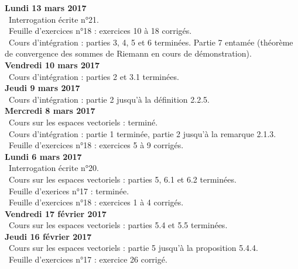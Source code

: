 \documentclass[12pt,a4paper]{article}
\begin{document}
\noindent\textbf{Lundi 13 mars 2017}\\
\bu\ Interrogation écrite n°21.\\
\bu\ Feuille d'exercices n°18 : exercices 10 à 18 corrigés.\\
\bu\ Cours d'intégration : parties 3, 4, 5 et 6 terminées. Partie 7 entamée (théorème de convergence des sommes de Riemann en cours de démonstration).\vspace{.4cm}\\

\noindent\textbf{Vendredi 10 mars 2017}\\
\bu\ Cours d'intégration : parties 2 et 3.1 terminées.\vspace{.4cm}\\

\noindent\textbf{Jeudi 9 mars 2017}\\
\bu\ Cours d'intégration : partie 2 jusqu'à la définition 2.2.5.\vspace{.4cm}\\

\noindent\textbf{Mercredi 8 mars 2017}\\
\bu\ Cours sur les espaces vectoriels : terminé.\\
\bu\ Cours d'intégration : partie 1 terminée, partie 2 jusqu'à la remarque 2.1.3.\\
\bu\ Feuille d'exercices n°18 : exercices 5 à 9 corrigés.\vspace{.4cm}\\

\noindent\textbf{Lundi 6 mars 2017}\\
\bu\ Interrogation écrite n°20.\\
\bu\ Cours sur les espaces vectoriels :  parties 5, 6.1 et 6.2 terminées.\\
\bu\ Feuille d'exerices n°17 : terminée.\\
\bu\ Feuille d'exercices n°18 : exercices 1 à 4 corrigés.\vspace{.4cm}\\

\noindent\textbf{Vendredi 17 février 2017}\\
\bu\ Cours sur les espaces vectoriels :  parties 5.4 et 5.5 terminées.\vspace{.4cm}\\

\noindent\textbf{Jeudi 16 février 2017}\\
\bu\ Cours sur les espaces vectoriels :  partie 5 jusqu'à la proposition 5.4.4.\\
\bu\ Feuille d'exercices n°17 : exercice 26 corrigé.\vspace{.4cm}\\
\end{document}

